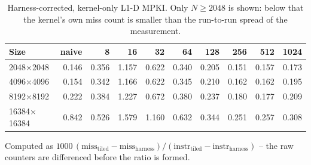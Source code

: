 \begin{table}[htbp]
\centering
\small
\caption{Harness-corrected, kernel-only L1-D MPKI. Only $N \geq 2048$ is shown: below that the kernel's own miss count is smaller than the run-to-run spread of the measurement.}
\label{tab:tile-mpki-kernel}
\begin{tabular}{lrrrrrrrrr}
\toprule
Size & naive & 8 & 16 & 32 & 64 & 128 & 256 & 512 & 1024 \\
\midrule
2048$\times$2048 & 0.146 & 0.356 & 1.157 & 0.622 & 0.340 & 0.205 & 0.151 & 0.157 & 0.173 \\
4096$\times$4096 & 0.154 & 0.342 & 1.166 & 0.622 & 0.345 & 0.210 & 0.162 & 0.162 & 0.195 \\
8192$\times$8192 & 0.222 & 0.384 & 1.227 & 0.672 & 0.380 & 0.237 & 0.180 & 0.177 & 0.209 \\
16384$\times$16384 & 0.842 & 0.526 & 1.579 & 1.160 & 0.632 & 0.344 & 0.251 & 0.257 & 0.308 \\
\bottomrule
\end{tabular}

\vspace{2pt}
\begin{minipage}{\linewidth}\footnotesize Computed as $1000\,(\text{miss}_{\text{tiled}} - \text{miss}_{\text{harness}}) / (\text{instr}_{\text{tiled}} - \text{instr}_{\text{harness}})$ -- the raw counters are differenced before the ratio is formed.\end{minipage}
\end{table}
